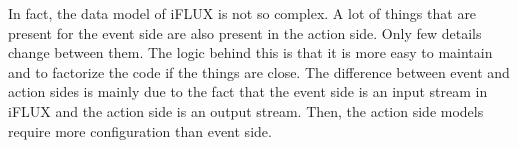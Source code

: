 In fact, the data model of iFLUX is not so complex. A lot of things that are present for the event side are also present in the action side. Only few details change between them. The logic behind this is that it is more easy to maintain and to factorize the code if the things are close. The difference between event and action sides is mainly due to the fact that the event side is an input stream in iFLUX and the action side is an output stream. Then, the action side models require more configuration than event side.



















